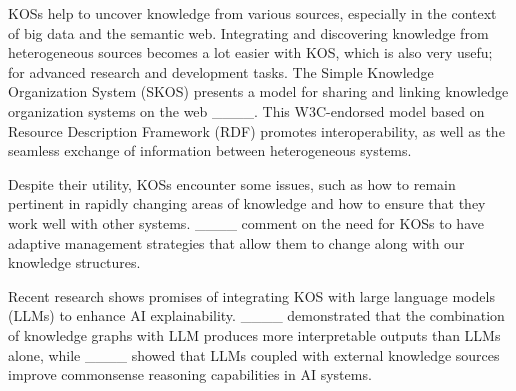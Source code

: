 KOSs help to uncover knowledge from various sources, especially in the context of big data and the semantic web. Integrating and discovering knowledge from heterogeneous sources becomes a lot easier with KOS, which is also very usefu; for advanced research and development tasks. The Simple Knowledge Organization System (SKOS) presents a model for sharing and linking knowledge organization systems on the web ____. This W3C-endorsed model based on Resource Description Framework (RDF) promotes interoperability, as well as the seamless exchange of information between heterogeneous systems. 

Despite their utility, KOSs encounter some issues, such as how to remain pertinent in rapidly changing areas of knowledge and how to ensure that they work well with other systems. ____ comment on the need for KOSs to have adaptive management strategies that allow them to change along with our knowledge structures.

Recent research shows promises of integrating KOS with large language models (LLMs) to enhance AI explainability. ____ demonstrated that the combination of knowledge graphs with LLM produces more interpretable outputs than LLMs alone, while ____ showed that LLMs coupled with external knowledge sources improve commonsense reasoning capabilities in AI systems.